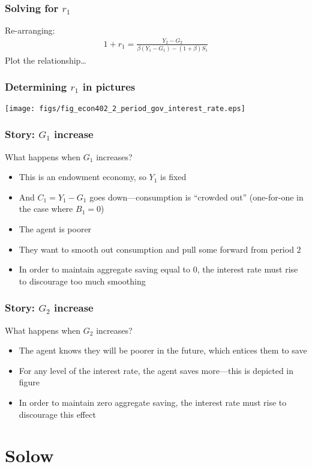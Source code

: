 \documentclass[presentation,dvipsnames]{beamer}
\begin{document}
\begin{frame}
\frametitle{Solving for $r_1$}
Re-arranging:
\begin{align*}
1+r_{1} = \frac{Y_{2}-G_{2}}{\beta \left( Y_{1}-G_{1} \right) - (1+\beta)S_{1}}
\end{align*}
Plot the relationship\dots
\end{frame}

\begin{frame}
\frametitle{Determining $r_{1}$ in pictures}
\centerline{\texttt{[image: figs/fig\_econ402\_2\_period\_gov\_interest\_rate.eps]}}
\end{frame}

\begin{frame}
\frametitle{Story: $G_{1}$ increase}
What happens when $G_{1}$ increases?
\begin{itemize}[label={--}]
\item This is an endowment economy, so $Y_{1}$ is fixed
\item And $C_{1} = Y_{1} - G_{1}$ goes down---consumption is ``crowded out'' (one-for-one in the case where $B_{1} = 0$)
\item The agent is poorer
\item They want to smooth out consumption and pull some forward from period $2$
\item In order to maintain aggregate saving equal to $0$, the interest rate must rise to discourage too much smoothing
\end{itemize}
\end{frame}

\begin{frame}
\frametitle{Story: $G_{2}$ increase}
What happens when $G_{2}$ increases?
\begin{itemize}[label={--}]
\item The agent knows they will be poorer in the future, which entices them to save
\item For any level of the interest rate, the agent saves more---this is depicted in figure
\item In order to maintain zero aggregate saving, the interest rate must rise to discourage this effect
\end{itemize}
\end{frame}

\label{sec-3}
\section{Solow}
\end{document}
